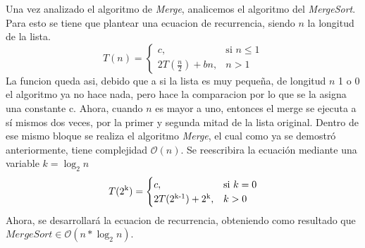 \documentclass[12pt,twoside]{article}
\begin{document}
Una vez analizado el algoritmo de \textit{Merge}, analicemos el algoritmo del \textit{MergeSort}. Para esto se tiene que plantear una ecuacion de recurrencia, siendo $n$ la longitud de la lista.
\[
    T(n) = 
\begin{cases}
    c, & \text{si } n \leq 1 \\
    2T(\frac{n}{2}) + bn, & n > 1
\end{cases}
\]
La funcion queda asi, debido que a si la lista es muy pequeña, de longitud $n$ 1 o 0 el algoritmo ya no hace nada, pero hace la comparacion por lo que se la asigna una constante c. Ahora, cuando $n$ es mayor a uno, entonces el merge se ejecuta a s\'i mismos dos veces, por la primer y segunda mitad de la lista original. Dentro de ese mismo bloque se realiza el algoritmo \textit{Merge}, el cual como ya se demostr\'o anteriormente, tiene complejidad $\mathcal{O}(n)$. Se reescribira la ecuaci\'on mediante una variable $k = \log_{2} n$
\[
    T(2\textsuperscript{k}) = 
\begin{cases}
    c, & \text{si } k = 0 \\
    2T(2\textsuperscript{k-1}) + 2\textsuperscript{k}, & k > 0
\end{cases}
\]
Ahora, se desarrollar\'a la ecuacion de recurrencia, obteniendo como resultado que $\textit{MergeSort} \in \mathcal{O}(n*\log_{2} n)$.
\end{document}
